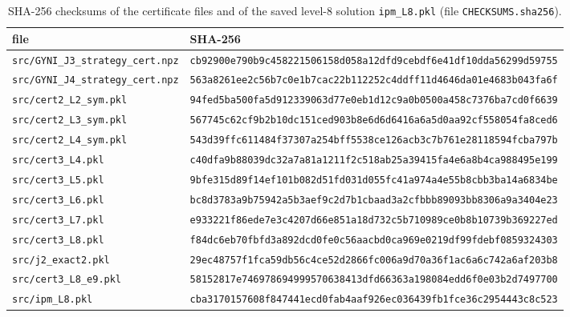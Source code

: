 \documentclass[aps,pra,onecolumn,notitlepage,superscriptaddress,longbibliography,nofootinbib,11pt]{revtex4-2}
\theoremstyle{remark}
\newcommand{\file}[1]{\texttt{#1}}
\begin{document}
\begin{table}[h]
\caption{SHA-256 checksums of the certificate files and of the saved level-8 solution \file{ipm\_L8.pkl} (file \file{CHECKSUMS.sha256}).}
\label{tab:S-sha}
\begin{ruledtabular}
\begin{tabular}{ll}
file & SHA-256\\
\hline
\scriptsize\file{src/GYNI\_J3\_strategy\_cert.npz} & \scriptsize\file{cb92900e790b9c458221506158d058a12dfd9cebdf6e41df10dda56299d59755}\\
\scriptsize\file{src/GYNI\_J4\_strategy\_cert.npz} & \scriptsize\file{563a8261ee2c56b7c0e1b7cac22b112252c4ddff11d4646da01e4683b043fa6f}\\
\scriptsize\file{src/cert2\_L2\_sym.pkl} & \scriptsize\file{94fed5ba500fa5d912339063d77e0eb1d12c9a0b0500a458c7376ba7cd0f6639}\\
\scriptsize\file{src/cert2\_L3\_sym.pkl} & \scriptsize\file{567745c62cf9b2b10dc151ced903b8e6d6d6416a6a5d0aa92cf558054fa8ced6}\\
\scriptsize\file{src/cert2\_L4\_sym.pkl} & \scriptsize\file{543d39ffc611484f37307a254bff5538ce126acb3c7b761e28118594fcba797b}\\
\scriptsize\file{src/cert3\_L4.pkl} & \scriptsize\file{c40dfa9b88039dc32a7a81a1211f2c518ab25a39415fa4e6a8b4ca988495e199}\\
\scriptsize\file{src/cert3\_L5.pkl} & \scriptsize\file{9bfe315d89f14ef101b082d51fd031d055fc41a974a4e55b8cbb3ba14a6834be}\\
\scriptsize\file{src/cert3\_L6.pkl} & \scriptsize\file{bc8d3783a9b75942a5b3aef9c2d7b1cbaad3a2cfbbb89093bb8306a9a3404e23}\\
\scriptsize\file{src/cert3\_L7.pkl} & \scriptsize\file{e933221f86ede7e3c4207d66e851a18d732c5b710989ce0b8b10739b369227ed}\\
\scriptsize\file{src/cert3\_L8.pkl} & \scriptsize\file{f84dc6eb70fbfd3a892dcd0fe0c56aacbd0ca969e0219df99fdebf0859324303}\\
\scriptsize\file{src/j2\_exact2.pkl} & \scriptsize\file{29ec48757f1fca59db56c4ce52d2866fc006a9d70a36f1ac6a6c742a6af203b8}\\
\scriptsize\file{src/cert3\_L8\_e9.pkl} & \scriptsize\file{58152817e746978694999570638413dfd66363a198084edd6f0e03b2d7497700}\\
\scriptsize\file{src/ipm\_L8.pkl} & \scriptsize\file{cba3170157608f847441ecd0fab4aaf926ec036439fb1fce36c2954443c8c523}\\
\end{tabular}
\end{ruledtabular}
\end{table}
\end{document}
